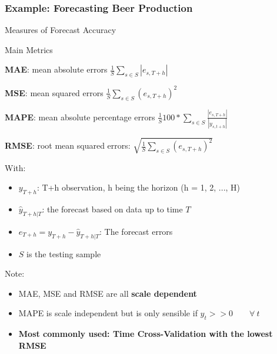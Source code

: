 \documentclass{beamer}
\newenvironment{wideitemize}{\itemize\addtolength{\itemsep}{10pt}}{\enditemize}
\begin{document}
\begin{frame}
  \frametitle{Example: Forecasting Beer Production}
\end{frame}

\begin{frame}{Measures of Forecast Accuracy}

  \begin{alertblock}{Main Metrics}
    \begin{wideitemize}
    \item \textbf{MAE}: mean absolute errors $\frac{1}{S}\sum_{s \in S} |e_{s, T+h}|$
    \item \textbf{MSE}: mean squared errors $\frac{1}{S}\sum_{s \in S} (e_{s, T+h})^2$
    \item \textbf{MAPE}: mean absolute percentage errors $\frac{1}{S}100*\sum_{s \in S} \frac{|e_{s, T+h}|}{|y_{s, t+h}|}$
    \item \textbf{RMSE}: root mean squared errors: $\sqrt{\frac{1}{S}\sum_{s \in S} (e_{s, T+h})^2}$
    \end{wideitemize}
  \end{alertblock}

  With:\\
  
  \begin{itemize}
  \item $y_{T+h}$: T+h observation, h being the horizon (h = 1, 2, ..., H)
  \item $\hat{y}_{T+h|T}$: the forecast based on data up to time $T$
  \item $e_{T+h} = y_{T+h} - \hat{y}_{T+h|T}$: The forecast errors
  \item $S$ is the testing sample
  \end{itemize}

  Note:\\
  \begin{itemize}
  \item MAE, MSE and RMSE are all \textbf{scale dependent}
  \item MAPE is scale independent but is only sensible if $y_t >> 0 \qquad \forall \ t$
  \item \textbf{Most commonly used: Time Cross-Validation with the lowest RMSE}
  \end{itemize}  
\end{frame}
\end{document}
